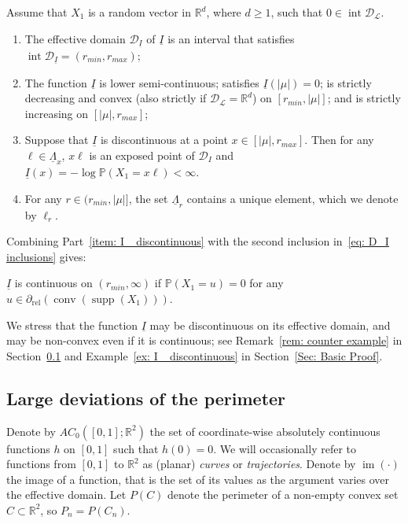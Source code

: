 \documentclass[AHL,Unicode,published]{cedram}
\DeclareMathOperator{\conv}{conv}
\DeclareMathOperator{\im}{im}
\DeclareMathOperator{\intr}{int}
\DeclareMathOperator{\rel}{rel}
\newcommand{\ubar}[1]{\underline{#1}}
\newcommand{\Rbb}{\mathbb{R}}
\newcommand{\Pbb}{\mathbb{P}}
\newcommand{\Dcl}{\mathcal{D}}
\newcommand{\Lcl}{\mathcal{L}}
\newcommand{\supp}{\mathop{\mathrm{supp}}\nolimits}
\newcommand*{\alphenumi}{\renewcommand*{\theenumi}{\alph{enumi}}}
\begin{document}
\begin{lemm}\label{lem: properties of I_}
Assume that $X_1$ is a random vector in $\Rbb^d$, where $d \ge 1$, such that $0 \in \intr \Dcl_{\Lcl}$.
\begin{enumerate}\alphenumi
\item \label{item: I_ eff domain}
The effective domain $\Dcl_{\ubar{I}}$ of $\ubar I$ is an interval that satisfies $\intr \Dcl_{\ubar{I}} = (r_{min}, r_{max})$;
\item \label{item: I_ unimodal}
The function $\ubar I$ is lower semi-continuous; satisfies $\ubar I (|\mu|)=0$; is strictly decreasing and convex (also strictly if $\Dcl_{\Lcl }=\Rbb^d$) on $[r_{min}, |\mu|]$; and is strictly increasing on $[|\mu|, r_{max}]$;
\item \label{item: I_ discontinuous}
Suppose that $\ubar I$ is discontinuous at a point $x \in [|\mu|, r_{max}]$. Then for any $\ell \in \ubar{\Lambda}_x$, $x \ell$ is an exposed point of $\Dcl_I$ and $\ubar I(x) = -\log \Pbb(X_1 = x \ell)<\infty$.
\item \label{item: one element}
For any $ r \in (r_{min}, |\mu|]$, the set $\ubar{\Lambda}_r$ contains a unique element, which we denote by $\ell_r$.
\end{enumerate}
\end{lemm}

Combining Part~\eqref{item: I_ discontinuous} with the second inclusion in~\eqref{eq: D_I inclusions} gives:
\begin{coro} \label{cor: I_ continuous}
$\ubar I$ is continuous on $(r_{min},\infty)$ if $\Pbb(X_1=u)=0$ for any $u \in \partial_{\rel}(\conv(\supp(X_1)))$.
\end{coro}

We stress that the function $\ubar I$ may be discontinuous on its effective domain, and may be non-convex even if it is continuous; see Remark~\ref{rem: counter example} in Section~\ref{sec: results perimeter} and Example~\ref{ex: I_ discontinuous} in Section~\ref{Sec: Basic Proof}.


\subsection{Large deviations of the perimeter} \label{sec: results perimeter}
Denote by $AC_0([0,1];\Rbb^2)$ the set of coordinate-wise absolutely continuous functions $h$ on $[0,1]$ such that $h(0)=0$. We will occasionally refer to functions from $[0,1]$ to $\Rbb^2$ as (planar) \emph{curves} or \emph{trajectories}. Denote by $\im(\cdot)$ the image of a function, that is the set of its values as the argument varies over the effective domain. Let $P(C)$ denote the perimeter of a non-empty convex set $C \subset \Rbb^2$, so $P_n=P(C_n)$.
\end{document}
